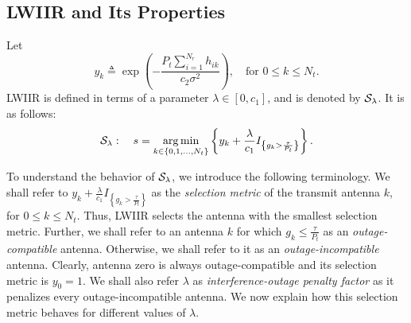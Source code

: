 \documentclass[12pt,draftcls,peerreview,onecolumn]{IEEEtran}
\newcommand{\cbrac}[1]{\left\{{#1}\right\}}
\newcommand{\indic}[1]{I_{\cbrac{#1}}}
\newcommand{\define}{\triangleq}
\DeclareMathOperator*{\argmin}{arg\,min}
\newcommand{\nx}{{0}}
\newcommand{\lam}{\lambda}
\newcommand{\Nt}{{N_t}}
\newcommand{\Nr}{{N_r}}
\newcommand{\Pt}{{P_t}}
\newcommand{\such}{h}
\newcommand{\puch}{g}
\newcommand{\hk}[1]{{\such_{#1}}}
\newcommand{\gk}[1]{{\puch_{#1}}}
\newcommand{\noisevar}{\sigma^2}
\newcommand{\itau}{\tau}
\newcommand{\cone}{c_{1}}
\newcommand{\ctwo}{c_{2}}
\newcommand{\m}{\cone}
\newcommand{\taubypt}{\frac{\itau}{\Pt}}
\newcommand{\gkgrtaubypt}[1]{{\gk{#1}}>\taubypt}
\newcommand{\gklttaubypt}[1]{{\gk{#1}}\leq\taubypt}
\newcommand{\gindic}[1]{\indic{\gkgrtaubypt{#1}}}
\newcommand{\lambym}{\frac{\lam}{\m}}
\newcommand{\yk}[1]{y_{#1}}
\newcommand{\ykplusgk}[1]{ \yk{#1} + \lambym\gindic{#1}}
\newcommand{\allopts}{\left\{\nx,1,\ldots,\Nt\right\}}
\newcommand{\callamrule}{{\cal S_{{\lam}}}}
\begin{document}
\subsection{LWIIR and Its Properties}
\label{sec:lambda_rule}
Let 
\begin{equation}
\yk{k} \define  \exp\left({- \frac{\Pt\sum_{i=1}^{\Nr}\hk{ik}}{\ctwo\noisevar} }\right), \quad \text{for}\,\,  0\leq k \leq\Nt.
\label{eq:yi_def}
\end{equation}
LWIIR is defined in terms of a parameter $\lam \in \left[0, \cone\right]$, and is denoted by $\callamrule$. It is as follows:
\begin{equation}
\callamrule: \quad s=\argmin\limits_{k\in\allopts} \left\{ \ykplusgk{k} \right\}.
\label{eq:lam_weight_rule}
\end{equation}

To understand the behavior of $\callamrule$, we introduce the following terminology. We shall refer to 
$\ykplusgk{k}$
as the {\em selection metric} of the transmit antenna $k$, for $0\leq k \leq\Nt$. Thus, LWIIR selects the antenna with the smallest selection metric. Further, we shall refer to an antenna $k$ for which $\gklttaubypt{k}$ as an {\em outage-compatible} antenna. Otherwise, we shall refer to it as an {\em outage-incompatible} antenna.  Clearly, antenna zero is always outage-compatible and its selection metric is $\yk{0}=1$. We shall also refer $\lam$ as {\em interference-outage penalty factor} as it penalizes every outage-incompatible antenna. We now explain how this selection metric behaves for different values of $\lam$.
\end{document}
